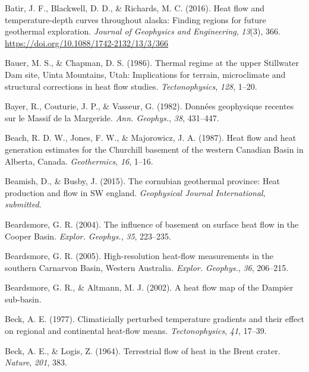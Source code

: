 \begin{CSLReferences}{1}{1}
\leavevmode{}%
Batir, J. F., Blackwell, D. D., \& Richards, M. C. (2016). Heat flow and temperature-depth curves throughout alaska: Finding regions for future geothermal exploration. \emph{Journal of Geophysics and Engineering}, \emph{13}(3), 366. \url{https://doi.org/10.1088/1742-2132/13/3/366}

\leavevmode{}%
Bauer, M. S., \& Chapman, D. S. (1986). Thermal regime at the upper {Stillwater Dam} site, {Uinta Mountains, Utah}: Implications for terrain, microclimate and structural corrections in heat flow studies. \emph{Tectonophysics}, \emph{128}, 1--20.

\leavevmode{}%
Bayer, R., Couturie, J. P., \& Vasseur, G. (1982). Données geophysique recentes sur le {Massif de la Margeride}. \emph{Ann. Geophys.}, \emph{38}, 431--447.

\leavevmode{}%
Beach, R. D. W., Jones, F. W., \& Majorowicz, J. A. (1987). Heat flow and heat generation estimates for the {Churchill} basement of the western {Canadian Basin} in {Alberta, Canada}. \emph{Geothermics}, \emph{16}, 1--16.

\leavevmode{}%
Beamish, D., \& Busby, J. (2015). The cornubian geothermal province: Heat production and flow in SW england. \emph{Geophysical Journal International}, \emph{submitted}.

\leavevmode{}%
Beardsmore, G. R. (2004). The influence of basement on surface heat flow in the {Cooper Basin}. \emph{Explor. Geophys.}, \emph{35}, 223--235.

\leavevmode{}%
Beardsmore, G. R. (2005). High-resolution heat-flow measurements in the southern {Carnarvon Basin, Western Australia}. \emph{Explor. Geophys.}, \emph{36}, 206--215.

\leavevmode{}%
Beardsmore, G. R., \& Altmann, M. J. (2002). A heat flow map of the {Dampier} sub-basin.

\leavevmode{}%
Beck, A. E. (1977). Climaticially perturbed temperature gradients and their effect on regional and continental heat-flow means. \emph{Tectonophysics}, \emph{41}, 17--39.

\leavevmode{}%
Beck, A. E., \& Logis, Z. (1964). Terrestrial flow of heat in the {Brent} crater. \emph{Nature}, \emph{201}, 383.


\end{CSLReferences}
